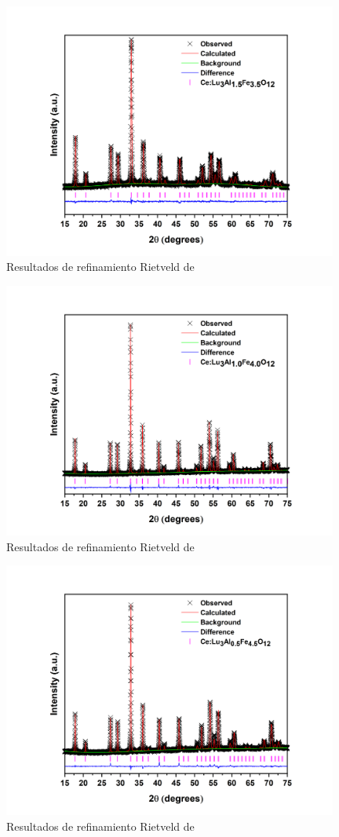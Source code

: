 \begin{appendix}
	\begin{figure}[h]
		\centering%
		\includegraphics[width=11cm]{Anexos/x35.png}%
		\caption{Resultados de refinamiento Rietveld de
		}\label{fig:refi35}
	\end{figure}

	\begin{figure}[h]
		\centering%
		\includegraphics[width=11cm]{Anexos/x40.png}%
		\caption{Resultados de refinamiento Rietveld de
		}\label{fig:refi40}
	\end{figure}

	\begin{figure}[t!]
		\centering%
		\includegraphics[width=11cm]{Anexos/x45.png}%
		\caption{Resultados de refinamiento Rietveld de
		}\label{fig:refi45}
	\end{figure}


\end{appendix}
